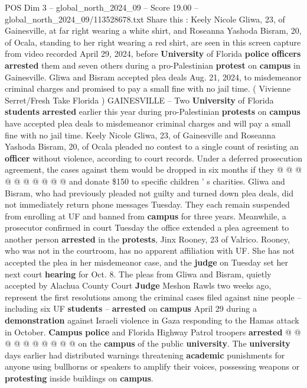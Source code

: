 \begin{textsample}{POS Dim 3 – global\_north\_2024\_09 – Score 19.00 – global\_north\_2024\_09/113528678.txt}  \label{ex:f3_pos_161}
Share this : Keely Nicole Gliwa, 23, of Gainesville, at far right wearing a white shirt, and Roseanna Yashoda Bisram, 20, of Ocala, standing to her right wearing a red shirt, are seen in this screen capture from video recorded April 29, 2024, before \textbf{University} of Florida \textbf{police} \textbf{officers} \textbf{arrested} them and seven others during a pro-Palestinian \textbf{protest} on \textbf{campus} in Gainesville.
Gliwa and Bisram accepted plea deals Aug. 21, 2024, to misdemeanor criminal charges and promised to pay a small fine with no jail time. ( Vivienne Serret/Fresh Take Florida ) GAINESVILLE -- Two \textbf{University} of Florida \textbf{students} \textbf{arrested} earlier this year during pro-Palestinian \textbf{protests} on \textbf{campus} have accepted plea deals to misdemeanor criminal charges and will pay a small fine with no jail time.
Keely Nicole Gliwa, 23, of Gainesville and Roseanna Yashoda Bisram, 20, of Ocala pleaded no contest to a single count of resisting an \textbf{officer} without violence, according to court records.
Under a deferred prosecution agreement, the cases against them would be dropped in six months if they @ @ @ @ @ @ @ @ @ @ and donate \$150 to specific children ' s charities.
Gliwa and Bisram, who had previously pleaded not guilty and turned down plea deals, did not immediately return phone messages Tuesday.
They each remain suspended from enrolling at UF and banned from \textbf{campus} for three years.
Meanwhile, a prosecutor confirmed in court Tuesday the office extended a plea agreement to another person \textbf{arrested} in the \textbf{protests}, Jinx Rooney, 23 of Valrico.
Rooney, who was not in the courtroom, has no apparent affiliation with UF.
She has not accepted the plea in her misdemeanor case, and the \textbf{judge} on Tuesday set her next court \textbf{hearing} for Oct. 8.
The pleas from Gliwa and Bisram, quietly accepted by Alachua County Court \textbf{Judge} Meshon Rawls two weeks ago, represent the first resolutions among the criminal cases filed against nine people -- including six UF \textbf{students} -- \textbf{arrested} on \textbf{campus} April 29 during a \textbf{demonstration} against Israeli violence in Gaza responding to the Hamas attack in October. \textbf{Campus} \textbf{police} and Florida Highway Patrol troopers \textbf{arrested} @ @ @ @ @ @ @ @ @ @ on the \textbf{campus} of the public \textbf{university}.
The \textbf{university} days earlier had distributed warnings threatening \textbf{academic} punishments for anyone using bullhorns or speakers to amplify their voices, possessing weapons or \textbf{protesting} inside buildings on \textbf{campus}.

\end{textsample}
